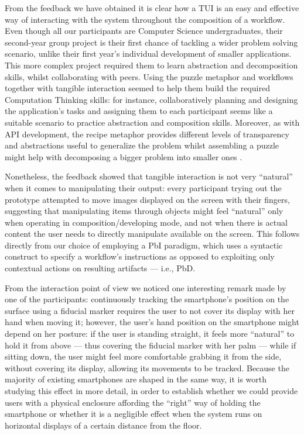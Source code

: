 From the feedback we have obtained it is clear how a \ac{TUI} is an easy and effective way of interacting with the system throughout the composition of a workflow. Even though all our participants are Computer Science undergraduates, their second-year group project is their first chance of tackling a wider problem solving scenario, unlike their first year's individual development of smaller applications. This more complex project required them to learn abstraction and decomposition skills, whilst collaborating with peers. Using the puzzle metaphor and workflows together with tangible interaction seemed to help them build the required Computation Thinking skills: for instance, collaboratively planning and designing the application's tasks and assigning them to each participant seems like a suitable scenario to practice abstraction and composition skills. Moreover, as with API development, the recipe metaphor provides different levels of transparency and abstractions useful to generalize the problem whilst assembling a puzzle might help with decomposing a bigger problem into smaller ones \cite{Wing:2008cv}.

Nonetheless, the feedback showed that tangible interaction is not very ``natural'' when it comes to manipulating their output: every participant trying out the prototype attempted to move images displayed on the screen with their fingers, suggesting that manipulating items through objects might feel ``natural'' only when operating in composition/developing mode, and not when there is actual content the user needs to directly manipulate available on the screen. This follows directly from our choice of employing a \ac{PbI} paradigm, which uses a syntactic construct to specify a workflow's instructions as opposed to exploiting only contextual actions on resulting artifacts --- i.e., \ac{PbD}. 

From the interaction point of view we noticed one interesting remark made by one of the participants: continuously tracking the smartphone's position on the surface using a fiducial marker requires the user to not cover its display with her hand when moving it; however, the user's hand position on the smartphone might depend on her posture: if the user is standing straight, it feels more ``natural'' to hold it from above --- thus covering the fiducial marker with her palm --- while if sitting down, the user might feel more comfortable grabbing it from the side, without covering its display, allowing its movements to be tracked. Because the majority of existing smartphones are shaped in the same way, it is worth studying this effect in more detail, in order to establish whether we could provide users with a physical enclosure affording the ``right'' way of holding the smartphone or whether it is a negligible effect when the system runs on horizontal displays of a certain distance from the floor.

